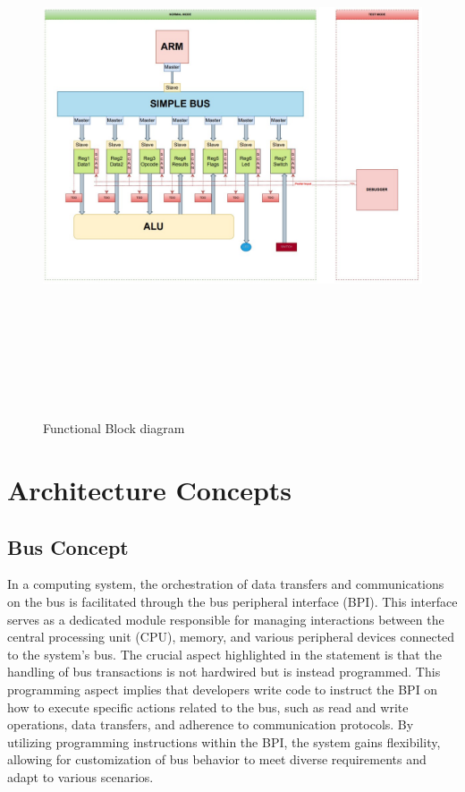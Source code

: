 \documentclass[a4paper,12pt,english]{report}
\begin{document}
\begin{figure}[h!]
  \centering
  \includegraphics[width=18cm, height=16cm]{F_blockdiagram.jpg}
  \caption{Functional Block diagram}
  \label{fig:fbd}
\end{figure}

\chapter{Architecture Concepts}

\section{Bus Concept}
In a computing system, the orchestration of data transfers and communications on the bus is facilitated through the bus peripheral interface (BPI). This interface serves as a dedicated module responsible for managing interactions between the central processing unit (CPU), memory, and various peripheral devices connected to the system's bus. The crucial aspect highlighted in the statement is that the handling of bus transactions is not hardwired but is instead programmed. This programming aspect implies that developers write code to instruct the BPI on how to execute specific actions related to the bus, such as read and write operations, data transfers, and adherence to communication protocols. By utilizing programming instructions within the BPI, the system gains flexibility, allowing for customization of bus behavior to meet diverse requirements and adapt to various scenarios.
\end{document}

